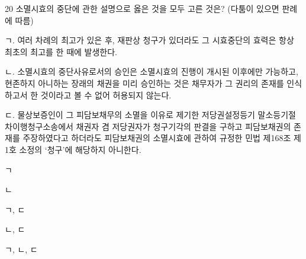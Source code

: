 \begin{question}{20}
소멸시효의 중단에 관한 설명으로 옳은 것을 모두 고른 것은? (다툼이 있으면 판례에 따름)
\begin{framedtext}
ㄱ. 여러 차례의 최고가 있은 후, 재판상 청구가 있더라도 그 시효중단의 효력은 항상 최초의 최고를 한 때에 발생한다. \par
ㄴ. 소멸시효의 중단사유로서의 승인은 소멸시효의 진행이 개시된 이후에만 가능하고, 현존하지 아니하는 장래의 채권을 미리 승인하는 것은 채무자가 그 권리의 존재를 인식하고서 한 것이라고 볼 수 없어 허용되지 않는다. \par
ㄷ. 물상보증인이 그 피담보채무의 소멸을 이유로 제기한 저당권설정등기 말소등기절차이행청구소송에서 채권자 겸 저당권자가 청구기각의 판결을 구하고 피담보채권의 존재를 주장하였다고 하더라도 피담보채권의 소멸시효에 관하여 규정한 민법 제168조 제1호 소정의 ‘청구’에 해당하지 아니한다. \par
\end{framedtext}
\begin{choices}
  \item ㄱ
  \item ㄴ
  \item ㄱ, ㄷ
  \item ㄴ, ㄷ
  \item ㄱ, ㄴ, ㄷ
\end{choices}
\end{question}
